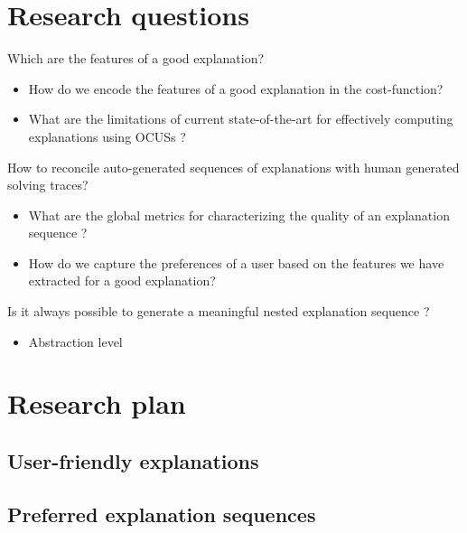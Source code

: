 \documentclass[a4paper,UKenglish,cleveref, autoref, cleveref, thm-restate,pdfa]{lipics-v2021}
\begin{document}
	\section{Research questions}
	\begin{RQ}
		\item\label{Features-good-explanation} Which are the features of a good explanation?
		\begin{itemize}
			\item How do we encode the features of a good explanation in the cost-function?
			\item What are the limitations of current state-of-the-art for effectively computing explanations using OCUSs ?
		\end{itemize}
		\item \label{reconcicle-explanation-sequences} How to reconcile auto-generated sequences of explanations with human generated solving traces? 
		\begin{itemize}
		\item What are the global metrics  for characterizing the quality of an explanation sequence ?
		\item How do we capture the preferences of a user based on the features we have extracted for a good explanation?
		\end{itemize}
		\item\label{meaningful-nested-sequence} Is it always possible to generate a meaningful nested explanation sequence ?
		\begin{itemize}
			\item Abstraction level
		\end{itemize}
	\end{RQ}
	
	\section{Research plan}
	
	\subsection{User-friendly explanations}
	
	
	\subsection{Preferred explanation sequences}
	
\end{document}

